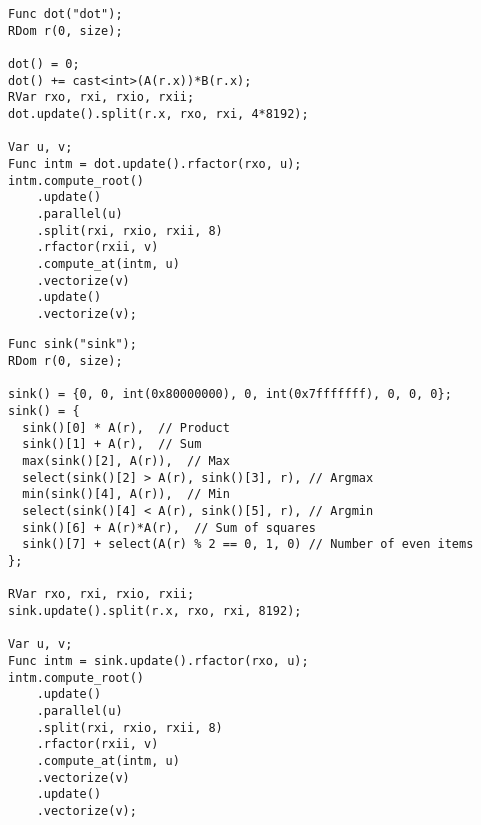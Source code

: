 \begin{lstlisting}[caption={Benchmark code for dot product}, label={lst:benchmark_dot_product}]
Func dot("dot");
RDom r(0, size);

dot() = 0;
dot() += cast<int>(A(r.x))*B(r.x);
RVar rxo, rxi, rxio, rxii;
dot.update().split(r.x, rxo, rxi, 4*8192);

Var u, v;
Func intm = dot.update().rfactor(rxo, u);
intm.compute_root()
    .update()
    .parallel(u)
    .split(rxi, rxio, rxii, 8)
    .rfactor(rxii, v)
    .compute_at(intm, u)
    .vectorize(v)
    .update()
    .vectorize(v);
\end{lstlisting}

\begin{lstlisting}[caption={Benchmark code for kitchen sink.}, label={lst:benchmark_kitchen_sink}]
Func sink("sink");
RDom r(0, size);

sink() = {0, 0, int(0x80000000), 0, int(0x7fffffff), 0, 0, 0};
sink() = {
  sink()[0] * A(r),  // Product
  sink()[1] + A(r),  // Sum
  max(sink()[2], A(r)),  // Max
  select(sink()[2] > A(r), sink()[3], r), // Argmax
  min(sink()[4], A(r)),  // Min
  select(sink()[4] < A(r), sink()[5], r), // Argmin
  sink()[6] + A(r)*A(r),  // Sum of squares
  sink()[7] + select(A(r) % 2 == 0, 1, 0) // Number of even items
};

RVar rxo, rxi, rxio, rxii;
sink.update().split(r.x, rxo, rxi, 8192);

Var u, v;
Func intm = sink.update().rfactor(rxo, u);
intm.compute_root()
    .update()
    .parallel(u)
    .split(rxi, rxio, rxii, 8)
    .rfactor(rxii, v)
    .compute_at(intm, u)
    .vectorize(v)
    .update()
    .vectorize(v);
\end{lstlisting}
